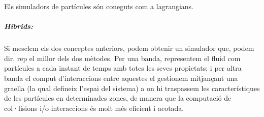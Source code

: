 \documentclass[a4paper]{article}
\begin{document}
	Els simuladors de partícules són coneguts com a lagrangians.
	\subparagraph[Híbrids]{Híbrids:} Si mesclem els dos conceptes anteriors, podem obtenir un simulador que, podem dir, rep el millor dels dos mètodes.\newline
	Per una banda, representem el fluid com partícules a cada instant de temps amb totes les seves propietats; i per altra banda el comput d'interaccions entre aquestes el gestionem mitjançant una graella (la qual defineix l'espai del sistema) a on hi traspassem les característiques de les partícules en determinades zones, de manera que la computació de col·lisions i/o interaccions és molt més eficient i acotada.   
	

\end{document}
